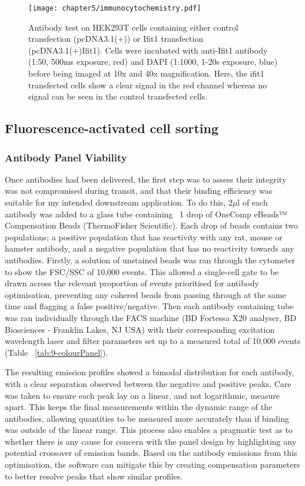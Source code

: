 \begin{figure*}[!htbp]
\centering
\texttt{[image: chapter5/immunocytochemistry.pdf]}
\caption[Antibody test on transfected HEK293T cells]{Antibody test on HEK293T cells containing either control transfection (pcDNA3.1(+)) or Ifit1 transfection (pcDNA3.1(+)Ifit1). Cells were incubated with anti-Ifit1 antibody (1:50, 500ms exposure, red) and DAPI (1:1000, 1-20s exposure, blue) before being imaged at 10x and 40x magnification. Here, the ifit1 transfected cells show a clear signal in the red channel whereas no signal can be seen in the control transfected cells.}
\label{fig:antibody_immunocyto}
\end{figure*}


\subsection{Fluorescence-activated cell sorting}

\subsubsection{Antibody Panel Viability}

Once antibodies had been delivered, the first step was to assess their integrity was not compromised during transit, and that their binding efficiency was suitable for my intended downstream application. To do this, 2$\mu$l of each antibody was added to a glass tube containing ~1 drop of OneComp eBeads™ Compensation Beads (ThermoFisher Scientific). Each drop of beads contains two populations; a positive population that has reactivity with any rat, mouse or hamster antibody, and a negative population that has no reactivity towards any antibodies. Firstly, a solution of unstained beads was ran through the cytometer to show the FSC/SSC of 10,000 events. This allowed a single-cell gate to be drawn across the relevant proportion of events prioritised for antibody optimisation, preventing any cohered beads from passing through at the same time and flagging a false positive/negative. Then each antibody containing tube was ran individually through the FACS machine (BD Fortessa X20 analyser, BD Biosciences - Franklin Lakes, NJ USA) with their corresponding excitation wavelength laser and filter parameters set up to a measured total of 10,000 events (Table ~\ref{tab:9-colourPanel}). 
        
The resulting emission profiles showed a bimodal distribution for each antibody, with a clear separation observed between the negative and positive peaks. Care was taken to ensure each peak lay on a linear, and not logarithmic, measure apart. This keeps the final measurements within the dynamic range of the antibodies, allowing quantities to be measured more accurately than if binding was outside of the linear range. This process also enables a pragmatic test as to whether there is any cause for concern with the panel design by highlighting any potential crossover of emission bands. Based on the antibody emissions from this optimisation, the software can mitigate this by creating compensation parameters to better resolve peaks that show similar profiles.

